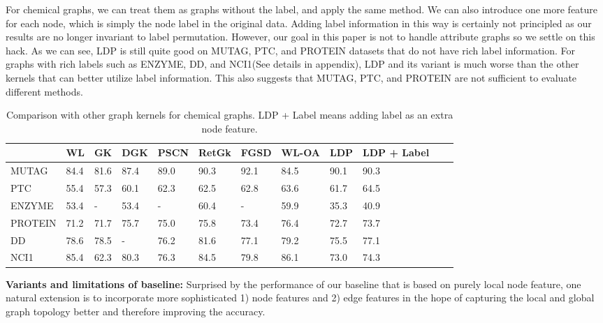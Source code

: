 \documentclass[11pt,onecolumn]{article}
\newcommand{\DOM}       {{LDP}\xspace}
\begin{document}
For chemical graphs, we can treat them as graphs without the label, and apply the same method. We can also introduce one more feature for each node, which is simply the node label in the original data. Adding label information in this way is certainly not principled as our results are no longer invariant to label permutation.  However, our goal in this paper is not to handle attribute graphs so we settle on this hack. As we can see, \DOM{} is still quite good on MUTAG, PTC, and PROTEIN datasets that do not have rich label information. For graphs with rich labels such as ENZYME, DD, and NCI1(See details in appendix), \DOM{} and its variant is much worse than the other kernels that can better utilize label information. This also suggests that MUTAG, PTC, and PROTEIN are not sufficient to evaluate different methods.
\begin{table}[h]
\label{tab: t4}
\centering
\begin{tabular}{@{}llllllllllll@{}}
\toprule
                      & WL        & GK        & DGK       & PSCN      & RetGk     & FGSD         & WL-OA     & \DOM{}  & \DOM{} + Label \\ \midrule    
MUTAG       & 84.4 & 81.6     & 87.4     & 89.0       & 90.3       &  92.1        & 84.5         & 90.1          & 90.3 \\              
PTC         & 55.4 & 57.3         & 60.1     & 62.3    & 62.5       &  62.8        & 63.6         &  61.7           & 64.5     \\               
ENZYME    & 53.4 & -         & 53.4     & -         & 60.4      &  -             & 59.9         &  35.3         & 40.9     \\                
PROTEIN   & 71.2 & 71.7         & 75.7     & 75.0     & 75.8       &  73.4        & 76.4         &  72.7           & 73.7 \\         
DD           & 78.6  & 78.5         & -        & 76.2    & 81.6       &  77.1        & 79.2         &  75.5            & 77.1 \\              
NCI1          & 85.4  & 62.3       & 80.3    & 76.3     & 84.5        &  79.8        & 86.1         &  73.0        & 74.3 \\    \bottomrule
\end{tabular}
\caption{Comparison with other graph kernels for chemical graphs. \DOM{} + Label means adding label as an extra node feature.}

\end{table}

\textbf{Variants and limitations of baseline: }
Surprised by the performance of our baseline that is based on purely local node feature, one natural extension is to incorporate more sophisticated 1) node features and 2) edge features in the hope of capturing the local and global graph topology better and therefore improving the accuracy. 
\end{document}
